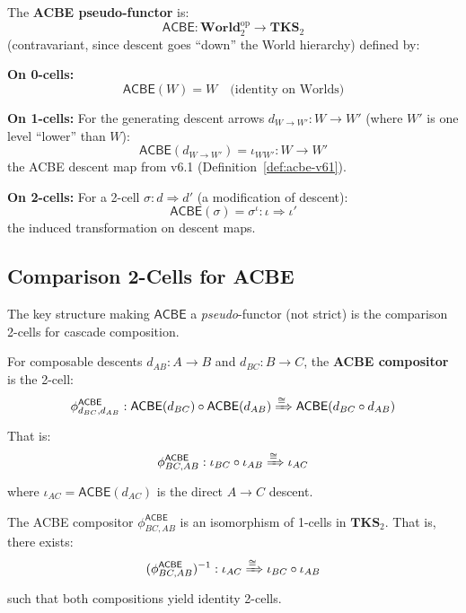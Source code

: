 \begin{definition}
\label{def:acbe-pseudo-functor}
The \textbf{ACBE pseudo-functor} is:
\[
  \mathsf{ACBE} : \mathbf{World}_2^{\mathrm{op}} \to \mathbf{TKS}_2
\]
(contravariant, since descent goes ``down'' the World hierarchy) defined by:

\textbf{On 0-cells:}
\[
  \mathsf{ACBE}(W) = W \quad \text{(identity on Worlds)}
\]

\textbf{On 1-cells:} For the generating descent arrows $d_{W \to W'} : W \to W'$
(where $W'$ is one level ``lower'' than $W$):
\[
  \mathsf{ACBE}(d_{W \to W'}) = \iota_{WW'} : W \to W'
\]
the ACBE descent map from v6.1 (Definition~\ref{def:acbe-v61}).

\textbf{On 2-cells:} For a 2-cell $\sigma : d \Rightarrow d'$ (a modification of descent):
\[
  \mathsf{ACBE}(\sigma) = \sigma^\iota : \iota \Rightarrow \iota'
\]
the induced transformation on descent maps.
\end{definition}

\subsection{Comparison 2-Cells for ACBE}

The key structure making $\mathsf{ACBE}$ a \emph{pseudo}-functor (not strict)
is the comparison 2-cells for cascade composition.

\begin{definition}
\label{def:acbe-compositor}
For composable descents $d_{AB} : A \to B$ and $d_{BC} : B \to C$, the
\textbf{ACBE compositor} is the 2-cell:
\[
  \phi^{\mathsf{ACBE}}_{d_{BC}, d_{AB}} :
  \mathsf{ACBE}(d_{BC}) \circ \mathsf{ACBE}(d_{AB})
  \xRightarrow{\cong}
  \mathsf{ACBE}(d_{BC} \circ d_{AB})
\]
That is:
\[
  \phi^{\mathsf{ACBE}}_{BC, AB} :
  \iota_{BC} \circ \iota_{AB}
  \xRightarrow{\cong}
  \iota_{AC}
\]
where $\iota_{AC} = \mathsf{ACBE}(d_{AC})$ is the direct $A \to C$ descent.
\end{definition}

\begin{proposition}
\label{prop:acbe-compositor-iso}
The ACBE compositor $\phi^{\mathsf{ACBE}}_{BC, AB}$ is an isomorphism of
1-cells in $\mathbf{TKS}_2$. That is, there exists:
\[
  (\phi^{\mathsf{ACBE}}_{BC, AB})^{-1} :
  \iota_{AC}
  \xRightarrow{\cong}
  \iota_{BC} \circ \iota_{AB}
\]
such that both compositions yield identity 2-cells.
\end{proposition}

